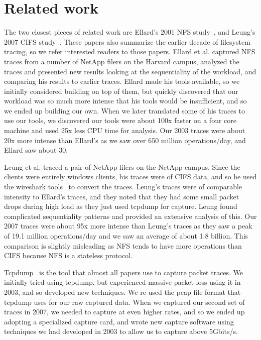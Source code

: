 \section{Related work}
\label{sec:related}


The two closest pieces of related work are Ellard's 2001 NFS
study~\cite{EllardFast03}, and Leung's 2007 CIFS
study~\cite{LeungUsenix08}.  These papers also summarize the earlier
decade of filesystem tracing, so we refer interested readers to those
papers.  Ellard et al. captured NFS traces from a number of NetApp
filers on the Harvard campus, analyzed the traces and presented new
results looking at the sequentiality of the workload, and comparing
his results to earlier traces.  Ellard made his tools available, so we
initially considered building on top of them, but quickly discovered
that our workload was so much more intense that his tools would be
insufficient, and so we ended up building our own.  When we later
translated some of his traces to use our tools, we discovered our
tools were about 100x faster on a four core machine and used 25x less
CPU time for analysis.  Our 2003 traces were about 20x more intense
than Ellard's as we saw over 650 million operations/day, and Ellard
saw about 30.

Leung et al. traced a pair of NetApp filers on the NetApp campus.
Since the clients were entirely windows clients, his traces were of
CIFS data, and so he used the wireshark tools~\cite{wireshark} to
convert the traces.  Leung's traces were of comparable intensity to
Ellard's traces, and they noted that they had some small packet drops
during high load as they just used tcpdump for capture.  Leung found
complicated sequentiality patterns and provided an extensive analysis
of this.  Our 2007 traces were about 95x more intense than Leung's
traces as they saw a peak of 19.1 million operations/day and we saw an
average of about 1.8 billion.  This comparison is slightly misleading
as NFS tends to have more operations than CIFS because NFS is a
stateless protocol.

Tcpdump~\cite{tcpdump} is the tool that almost all papers use to capture packet
traces.  We initially tried using tcpdump, but experienced massive
packet loss using it in 2003, and so developed new techniques.  We
re-used the pcap file format that tcpdump uses for our raw captured
data.  When we captured our second set of traces in 2007, we needed to
capture at even higher rates, and so we ended up adopting a
specialized capture card, and wrote new capture software using
techniques we had developed in 2003 to allow us to capture above
5Gbits/s.

